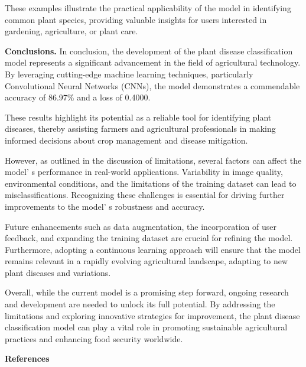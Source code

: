 \begin{multicols}{2}
These examples illustrate the practical applicability of the model in
identifying common plant species, providing valuable insights for users
interested in gardening, agriculture, or plant care.

{\bfseries Conclusions.} In conclusion, the development of the plant
disease classification model represents a significant advancement in the
field of agricultural technology. By leveraging cutting-edge machine
learning techniques, particularly Convolutional Neural Networks (CNNs),
the model demonstrates a commendable accuracy of 86.97\% and a loss of
0.4000.

These results highlight its potential as a reliable tool for identifying
plant diseases, thereby assisting farmers and agricultural professionals
in making informed decisions about crop management and disease
mitigation.

However, as outlined in the discussion of limitations, several factors
can affect the model' s performance in real-world
applications. Variability in image quality, environmental conditions,
and the limitations of the training dataset can lead to
misclassifications. Recognizing these challenges is essential for
driving further improvements to the model' s robustness
and accuracy.

Future enhancements such as data augmentation, the incorporation of user
feedback, and expanding the training dataset are crucial for refining
the model. Furthermore, adopting a continuous learning approach will
ensure that the model remains relevant in a rapidly evolving
agricultural landscape, adapting to new plant diseases and variations.

Overall, while the current model is a promising step forward, ongoing
research and development are needed to unlock its full potential. By
addressing the limitations and exploring innovative strategies for
improvement, the plant disease classification model can play a vital
role in promoting sustainable agricultural practices and enhancing food
security worldwide.
\end{multicols}

\begin{center}
{\bfseries References}
\end{center}

